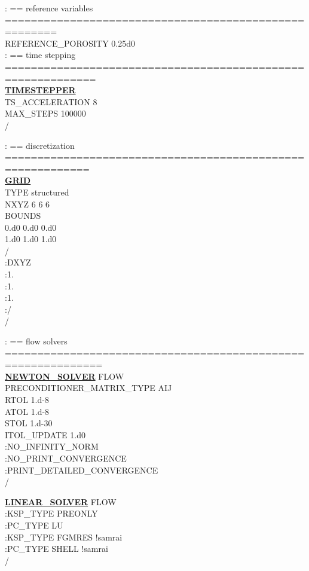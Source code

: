 \documentclass[12pt]{article}
\begin{document}
\noindent
: == reference variables ======================================================\\
REFERENCE\_POROSITY 0.25d0\\

\noindent
: == time stepping ============================================================\\
\hyperlink{target_timestep}{\bf TIMESTEPPER}\\
TS\_ACCELERATION 8\\
MAX\_STEPS 100000\\
/

\noindent
: == discretization ===========================================================\\
\hyperlink{target_grid}{\bf GRID}\\
TYPE structured\\
NXYZ 6 6 6\\
BOUNDS\\
0.d0 0.d0 0.d0\\
1.d0 1.d0 1.d0\\
/\\
:DXYZ\\
:1.\\
:1.\\
:1.\\
:/\\
/

\noindent
: == flow solvers =============================================================\\
\hyperlink{target_newt}{\bf NEWTON\_SOLVER} FLOW\\
PRECONDITIONER\_MATRIX\_TYPE AIJ\\
RTOL 1.d-8\\
ATOL 1.d-8\\
STOL 1.d-30\\
ITOL\_UPDATE 1.d0\\
:NO\_INFINITY\_NORM\\
:NO\_PRINT\_CONVERGENCE\\
:PRINT\_DETAILED\_CONVERGENCE\\
/

\noindent
\hyperlink{target_linsolv}{\bf LINEAR\_SOLVER} FLOW\\
:KSP\_TYPE PREONLY\\
:PC\_TYPE LU\\
:KSP\_TYPE FGMRES !samrai\\
:PC\_TYPE SHELL !samrai\\
/
\end{document}
